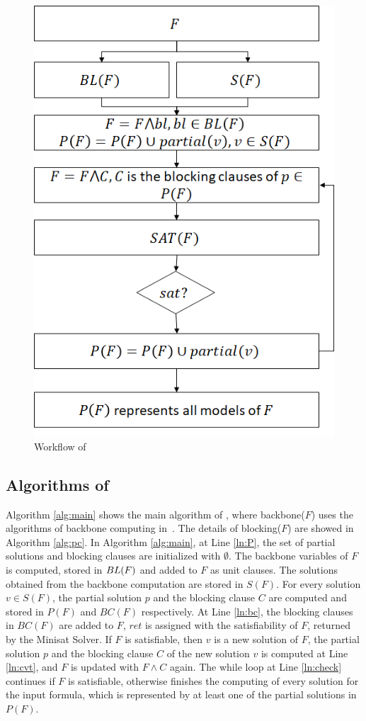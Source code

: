 \begin{figure}
    \centering
    \includegraphics[scale=0.4]{workflow.png}
    \caption{Workflow of \tool}
    \label{fig:overflow}
\end{figure}

\subsection{Algorithms of \tool}
Algorithm \ref{alg:main} shows the main algorithm of \tool, where backbone($F$) uses the algorithms of backbone computing in~\cite{bb}.
The details of blocking($F$) are showed in Algorithm \ref{alg:pc}.
In Algorithm \ref{alg:main}, at Line \ref{ln:P}, the set of partial solutions and blocking clauses are initialized with $\emptyset$. The backbone variables of $F$ is computed, stored in ${\sc BL}(F)$ and added to $F$ as unit clauses. The solutions obtained from the backbone computation are stored in $S(F)$.
For every solution $v\in S(F)$, the partial solution $p$ and the blocking clause $C$ are computed and stored in $P(F)$ and $BC(F)$ respectively. 
At Line \ref{ln:bc}, the blocking clauses in $BC(F)$ are added to $F$, $ret$ is assigned with the satisfiability of $F$, returned by the Minisat Solver. If $F$ is satisfiable, then $v$ is a new solution of $F$, the partial solution $p$ and the blocking clause $C$ of the new solution $v$ is computed at Line \ref{ln:cvt}, and $F$ is updated with $F\wedge C$ again. The while loop at Line \ref{ln:check} continues if $F$ is satisfiable, otherwise \tool finishes the computing of every solution for the input formula, which is represented by at least one of the partial solutions in $P(F)$.

